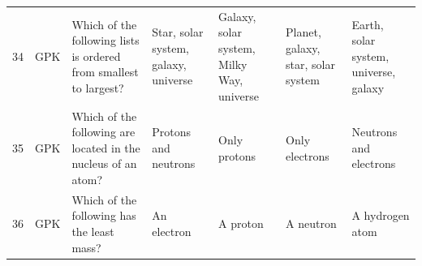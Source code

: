 \documentclass[10pt]{article}
\begin{document}
\begin{tiny}
\begin{longtable}{r P{0.3in} P{1.203in} P{0.8in} P{0.8in} P{0.8in} P{0.8in}}
    34    &      GPK &                                                                                                                                                                                                                Which of the following lists is ordered from smallest to largest? &                                                                                                  Star, solar system, galaxy, universe &                                                             Galaxy, solar system, Milky Way, universe &                                                                                         Planet, galaxy, star, solar system &                                                                                             Earth, solar system, universe, galaxy \\
    35    &      GPK &                                                                                                                                                                                                                    Which of the following are located in the nucleus of an atom? &                                                                                                                  Protons and neutrons &                                                                                          Only protons &                                                                                                             Only electrons &                                                                                                            Neutrons and electrons \\
    36    &      GPK &                                                                                                                                                                                                                                       Which of the following has the least mass? &                                                                                                                           An electron &                                                                                              A proton &                                                                                                                  A neutron &                                                                                                                   A hydrogen atom \\

\end{longtable}
\end{tiny}
\end{document}
